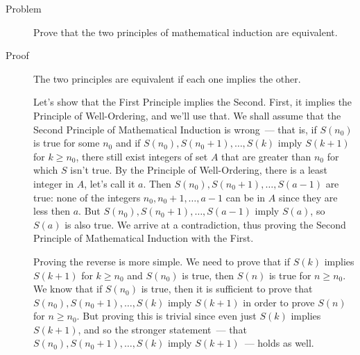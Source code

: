 \begin{description}
\item[Problem] Prove that the two principles of mathematical induction are
equivalent.

\item[Proof] The two principles are equivalent if each one implies the other.

Let's show that the First Principle implies the Second. First, it implies the
Principle of Well-Ordering, and we'll use that. We shall assume that the Second
Principle of Mathematical Induction is wrong~--- that is, if $S(n_0)$ is true
for some $n_0$ and if $S(n_0), S(n_0 + 1), \dots, S(k)$ imply $S(k+1)$ for $k
\ge n_0$, there still exist integers of set $A$ that are greater than $n_0$ for
which $S$ isn't true. By the Principle of Well-Ordering, there is a least
integer in $A$, let's call it $a$. Then $S(n_0), S(n_0 + 1), \dots, S(a - 1)$
are true: none of the integers $n_0, n_0 + 1, \dots, a - 1$ can be in $A$ since
they are less then $a$. But $S(n_0), S(n_0 + 1), \dots, S(a - 1)$ imply $S(a)$,
so $S(a)$ is also true. We arrive at a contradiction, thus proving the Second
Principle of Mathematical Induction with the First.

Proving the reverse is more simple. We need to prove that if $S(k)$ implies
$S(k+1)$ for $k \ge n_0$ and $S(n_0)$ is true, then $S(n)$ is true for $n \ge
n_0$. We know that if $S(n_0)$ is true, then it is sufficient to prove that
$S(n_0), S(n_0 + 1), \dots, S(k)$ imply $S(k+1)$ in order to prove $S(n)$ for
$n \ge n_0$. But proving this is trivial since even just $S(k)$ implies
$S(k+1)$, and so the stronger statement~--- that $S(n_0), S(n_0 + 1), \dots,
S(k)$ imply $S(k+1)$~--- holds as well.

\end{description}

